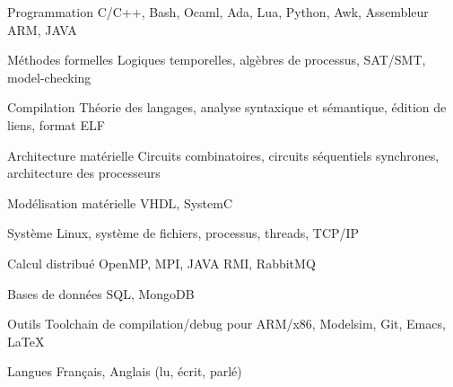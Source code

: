 


\begin{cvskills}


\cvskill
{Programmation} %
{C/C++, Bash, Ocaml, Ada, Lua, Python, Awk, Assembleur ARM, JAVA} %


\cvskill
{Méthodes formelles} %
{Logiques temporelles, algèbres de processus, SAT/SMT, model-checking} %


\cvskill
{Compilation}%
{Théorie des langages, analyse syntaxique et sémantique, édition de liens, format ELF}

\cvskill
{Architecture matérielle}%
{Circuits combinatoires, circuits séquentiels synchrones, architecture des processeurs}

\cvskill
{Modélisation matérielle}%
{VHDL, SystemC}


\cvskill
{Système}%
{Linux, système de fichiers, processus, threads, TCP/IP}


\cvskill
{Calcul distribué}%
{OpenMP, MPI, JAVA RMI, RabbitMQ}


\cvskill
{Bases de données}%
{SQL, MongoDB}


\cvskill
{Outils}%
{Toolchain de compilation/debug pour ARM/x86, Modelsim, Git, Emacs, \LaTeX}


\cvskill
{Langues} %
{Français, Anglais (lu, écrit, parlé)} %


\end{cvskills}
